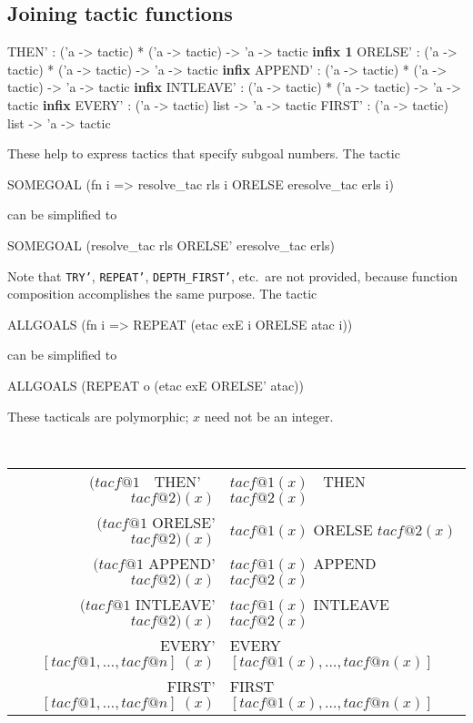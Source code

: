 \subsection{Joining tactic functions}
\begin{ttbox} 
THEN'     : ('a -> tactic) * ('a -> tactic) -> 'a -> tactic \hfill{\bf infix 1}
ORELSE'   : ('a -> tactic) * ('a -> tactic) -> 'a -> tactic \hfill{\bf infix}
APPEND'   : ('a -> tactic) * ('a -> tactic) -> 'a -> tactic \hfill{\bf infix}
INTLEAVE' : ('a -> tactic) * ('a -> tactic) -> 'a -> tactic \hfill{\bf infix}
EVERY'    : ('a -> tactic) list -> 'a -> tactic
FIRST'    : ('a -> tactic) list -> 'a -> tactic
\end{ttbox}
These help to express tactics that specify subgoal numbers.  The tactic
\begin{ttbox} 
SOMEGOAL (fn i => resolve_tac rls i  ORELSE  eresolve_tac erls i)
\end{ttbox}
can be simplified to
\begin{ttbox} 
SOMEGOAL (resolve_tac rls  ORELSE'  eresolve_tac erls)
\end{ttbox}
Note that {\tt TRY'}, {\tt REPEAT'}, {\tt DEPTH_FIRST'}, etc.\ are not
provided, because function composition accomplishes the same purpose.
The tactic
\begin{ttbox} 
ALLGOALS (fn i => REPEAT (etac exE i  ORELSE  atac i))
\end{ttbox}
can be simplified to
\begin{ttbox} 
ALLGOALS (REPEAT o (etac exE  ORELSE'  atac))
\end{ttbox}
These tacticals are polymorphic; $x$ need not be an integer.
\begin{center} \tt
\begin{tabular}{r@{\rm\ \ yields\ \ }l}
    $(tacf@1$~~THEN'~~$tacf@2)(x)$ \index{*THEN'} &
    $tacf@1(x)$~~THEN~~$tacf@2(x)$ \\

    $(tacf@1$ ORELSE' $tacf@2)(x)$ \index{*ORELSE'} &
    $tacf@1(x)$ ORELSE $tacf@2(x)$ \\

    $(tacf@1$ APPEND' $tacf@2)(x)$ \index{*APPEND'} &
    $tacf@1(x)$ APPEND $tacf@2(x)$ \\

    $(tacf@1$ INTLEAVE' $tacf@2)(x)$ \index{*INTLEAVE'} &
    $tacf@1(x)$ INTLEAVE $tacf@2(x)$ \\

    EVERY' $[tacf@1,\ldots,tacf@n] \; (x)$ \index{*EVERY'} &
    EVERY $[tacf@1(x),\ldots,tacf@n(x)]$ \\

    FIRST' $[tacf@1,\ldots,tacf@n] \; (x)$ \index{*FIRST'} &
    FIRST $[tacf@1(x),\ldots,tacf@n(x)]$
\end{tabular}
\end{center}


